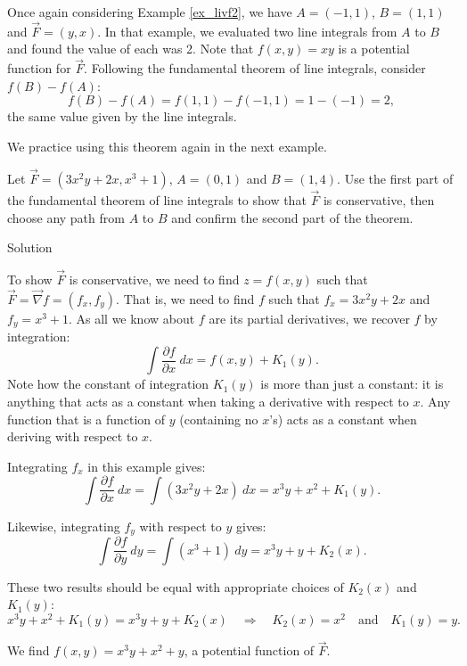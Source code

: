 Once again considering Example \ref{ex_livf2}, we have $A = (-1,1)$, $B = (1,1)$ and $\vec F = \left( y,x\right)$. In that example, we evaluated two line integrals from $A$ to $B$ and found the value of each was 2. Note that $f(x,y) = xy$ is a potential function for $\vec F$. Following the fundamental theorem of line integrals, consider $f(B) - f(A)$:
$$f(B) - f(A) = f(1,1) - f(-1,1) = 1 - (-1) = 2,$$
the same value given by the line integrals.


We practice using this theorem again in the next example.

\begin{example}\label{ex_livf5}
Let $\vec F = \left( 3x^2y+2x, x^3+1\right)$, $A = (0,1)$ and $B = (1,4)$. Use the first part of the fundamental theorem of line integrals to show that $\vec F$ is conservative, then choose any path from $A$ to $B$ and confirm the second part of the theorem.

Solution 


To show $\vec F$ is conservative, we need to find $z = f(x,y)$ such that $\vec F = \vec{\nabla} f = \left( f_x, f_y\right)$. That is, we need to find $f$ such that $f_x = 3x^2y+2x$ and $f_y = x^3+1$. As all we know about $f$ are its partial derivatives, we recover $f$ by integration:
$$\int\limits \frac{\partial f}{\partial x}\ dx = f(x,y) + K_1(y).$$
Note how the constant of integration $K_1(y)$ is more than just a constant: it is anything that acts as a constant when taking a derivative with respect to $x$. Any function that is a function of $y$ (containing no $x$'s) acts as a constant when deriving with respect to $x$.

Integrating $f_x$ in this example gives:
$$\int\limits \frac{\partial f}{\partial x}\ dx = \int\limits (3x^2y+2x)\ dx = x^3y+x^2 + K_1(y).$$

Likewise, integrating $f_y$ with respect to $y$ gives:
$$\int\limits \frac{\partial f}{\partial y}\ dy = \int\limits( x^3+1)\ dy = x^3y+ y + K_2(x).$$

These two results should be equal with appropriate choices of $K_2(x)$ and $K_1(y)$:
$$x^3y+x^2 + K_1(y) = x^3y+ y + K_2(x)\quad \Rightarrow\quad K_2(x) = x^2 \quad \text{and}\quad K_1(y) = y.$$

We find $f(x,y) = x^3y+x^2+y$, a potential function of $\vec F$. 


\end{example}
